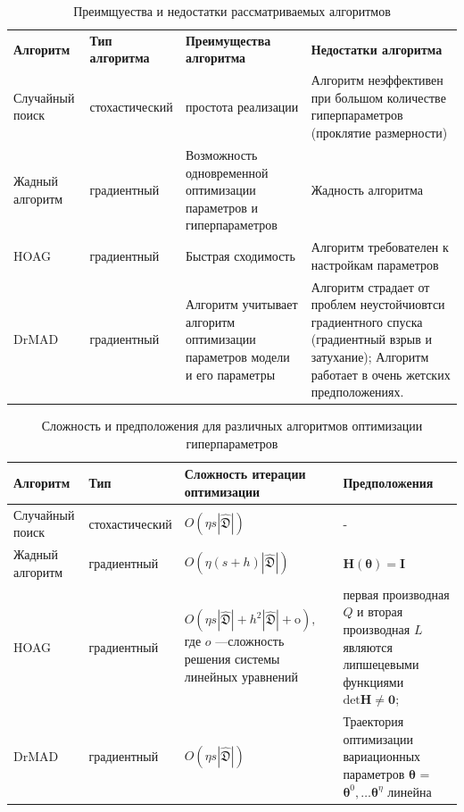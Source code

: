 \begin{table}[H]
\small

\begin{tabularx}{\textwidth}{|X|X|X|X|}
\hline
\bf Алгоритм & \bf Тип алгоритма & \bf Преимущества алгоритма & \bf Недостатки алгоритма  \\ 
Случайный поиск & стохастический & простота реализации& Алгоритм неэффективен при большом количестве гиперпараметров (проклятие размерности)  \\ \hline
Жадный алгоритм~\cite{greed_hyper} & градиентный & Возможность одновременной оптимизации параметров и гиперпараметров & Жадность алгоритма \\ \hline
HOAG~\cite{hyper_hoag} & градиентный & Быстрая сходимость & Алгоритм требователен к настройкам параметров \\ \hline 
DrMAD~\cite{hyper_mad} & градиентный & Алгоритм учитывает алгоритм оптимизации параметров модели и его параметры & Алгоритм страдает от проблем неустойчиовтси градиентного спуска (градиентный взрыв и затухание); Алгоритм работает в очень жетских предположениях. \\ \hline
\end{tabularx}

\caption{Преимщуества и недостатки рассматриваемых алгоритмов}
\label{table:algo_descr}

\end{table}


\begin{table}[H]
\small

\begin{tabularx}{\textwidth}{|X|X|X|X|}
\hline
\bf Алгоритм & \bf Тип & \bf Сложность итерации оптимизации & \bf Предположения \\ 
\hline
Случайный поиск & стохастический & $O(\eta s |\hat{\mathfrak{D}}|)$& -  \\ \hline
Жадный алгоритм~\cite{greed_hyper} & градиентный & $O(\eta (s+h) |\hat{\mathfrak{D}}|)$ & $\mathbf{H}(\boldsymbol{\theta}) = \mathbf{I}$  \\ \hline
HOAG~\cite{hyper_hoag} & градиентный & $O(\eta s |\hat{\mathfrak{D}}| + h^2 |\hat{\mathfrak{D}}| + \text{o}),$ где $o$ ---сложность решения системы линейных уравнений& первая производная $Q$  и вторая производная $L$  являются липшецевыми функциями  $\text{det}\mathbf{H} \neq \mathbf{0}$;  \\ \hline
DrMAD~\cite{hyper_mad} & градиентный &$O(\eta s |\hat{\mathfrak{D}}|)$ & Траектория оптимизации вариационных параметров $\boldsymbol{\theta}$ = $\boldsymbol{\theta}^0, \dots \boldsymbol{\theta}^\eta$  линейна \\ \hline
\end{tabularx}

\caption{Сложность и предположения для различных алгоритмов оптимизации гиперпараметров}
\label{table:algo_descr2}

\end{table}






